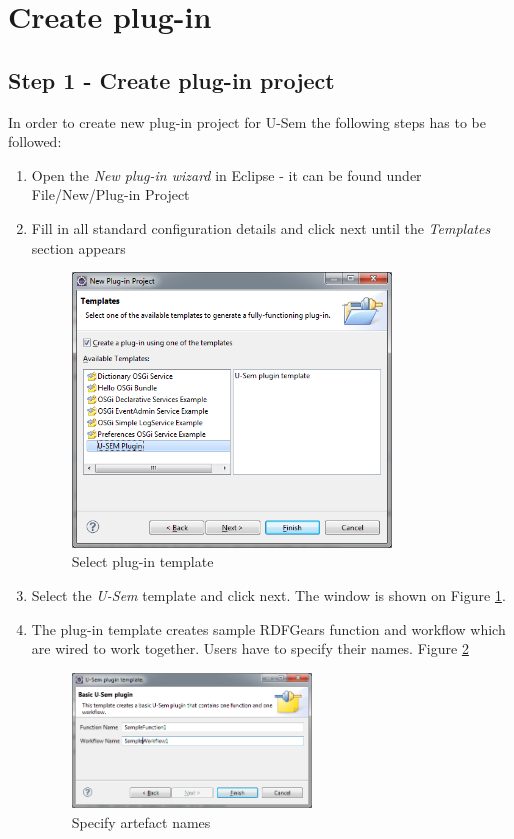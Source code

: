 \documentclass[a4paper, notitlepage]{article}
\begin{document}
\section{Create plug-in}

\subsection{Step 1 - Create plug-in project}
	In order to create new plug-in project for U-Sem the following steps has to be followed:
	\begin{enumerate}
		\item Open the \textit{New plug-in wizard} in Eclipse - it can be found under File/New/Plug-in Project
		\item Fill in all standard configuration details and click next until the \textit{Templates} section appears

\begin{figure}
  \centering
    \includegraphics[width=0.8\textwidth]{wiz_templ.png}
    \caption{Select plug-in template}
    \label{templ}
\end{figure}

		\item Select the \textit{U-Sem} template and click next. The window is shown on Figure \ref{templ}.
		\item The plug-in template creates sample RDFGears function and workflow which are wired to work together. Users have to specify their names. Figure \ref{art}
		
\begin{figure}
  \centering
    \includegraphics[width=0.6\textwidth]{wiz_art.png}
    \caption{Specify artefact names}
    \label{art}
\end{figure}


\end{enumerate}
\end{document}
